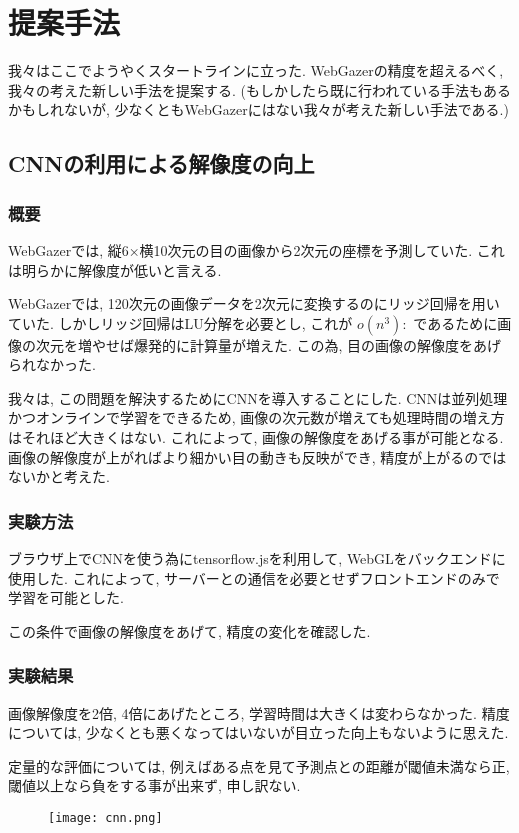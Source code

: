 \documentclass[a4paper,11pt]{jsarticle}
\begin{document}
\section{提案手法}
我々はここでようやくスタートラインに立った.
WebGazerの精度を超えるべく, 我々の考えた新しい手法を提案する. 
(もしかしたら既に行われている手法もあるかもしれないが, 少なくともWebGazerにはない我々が考えた新しい手法である.)

\subsection{CNNの利用による解像度の向上}
\subsubsection{概要}
WebGazerでは, 縦6×横10次元の目の画像から2次元の座標を予測していた. これは明らかに解像度が低いと言える.

WebGazerでは, 120次元の画像データを2次元に変換するのにリッジ回帰を用いていた.
しかしリッジ回帰はLU分解を必要とし, これが $o(n^3):$ であるために画像の次元を増やせば爆発的に計算量が増えた.
この為, 目の画像の解像度をあげられなかった.

我々は, この問題を解決するためにCNNを導入することにした.
CNNは並列処理かつオンラインで学習をできるため, 画像の次元数が増えても処理時間の増え方はそれほど大きくはない.
これによって, 画像の解像度をあげる事が可能となる.
画像の解像度が上がればより細かい目の動きも反映ができ, 精度が上がるのではないかと考えた.

\subsubsection{実験方法}
ブラウザ上でCNNを使う為にtensorflow.jsを利用して, WebGLをバックエンドに使用した.
これによって, サーバーとの通信を必要とせずフロントエンドのみで学習を可能とした.

この条件で画像の解像度をあげて, 精度の変化を確認した.

\subsubsection{実験結果}
画像解像度を2倍, 4倍にあげたところ, 学習時間は大きくは変わらなかった.
精度については, 少なくとも悪くなってはいないが目立った向上もないように思えた.

定量的な評価については, 例えばある点を見て予測点との距離が閾値未満なら正, 閾値以上なら負をする事が出来ず, 申し訳ない.

\begin{figure}
  \begin{center}
    \texttt{[image: cnn.png]}
    \caption{}
    \label{fig:kakumaku}
  \end{center}
\end{figure}
\end{document}
